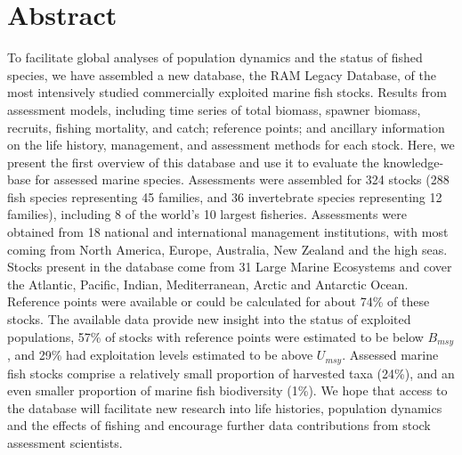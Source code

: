 \section*{Abstract}


To facilitate global analyses of population dynamics and the status of
fished species, we have assembled a new database, the RAM Legacy
Database, of the most intensively studied commercially exploited
marine fish stocks. Results from assessment models, including time
series of total biomass, spawner biomass, recruits, fishing mortality,
and catch; reference points; and ancillary information on the life
history, management, and assessment methods for each stock.  Here, we
present the first overview of this database and use it to evaluate the
knowledge-base for assessed marine species.  Assessments were
assembled for 324 stocks
(288 fish species representing
45 families, and 36
invertebrate species representing 12
families), including 8 of the world's 10 largest fisheries.
Assessments were obtained from 18 national and international
management institutions, with most coming from North America, Europe,
Australia, New Zealand and the high seas. Stocks present in the
database come from 31 Large Marine Ecosystems
and cover the Atlantic, Pacific, Indian, Mediterranean, Arctic and Antarctic
Ocean. Reference points were available or could be calculated for
about 74\% of these stocks. The available
data provide new insight into the status of exploited populations,
57\% of stocks with reference points
were estimated to be below $B_{msy}$, and
29\% had exploitation levels
estimated to be above $U_{msy}$.  Assessed marine fish stocks comprise
a relatively small proportion of harvested taxa (24\%), and an even
smaller proportion of marine fish biodiversity (1\%). We hope that
access to the database will facilitate new research into life
histories, population dynamics and the effects of fishing and
encourage further data contributions from stock assessment scientists.

